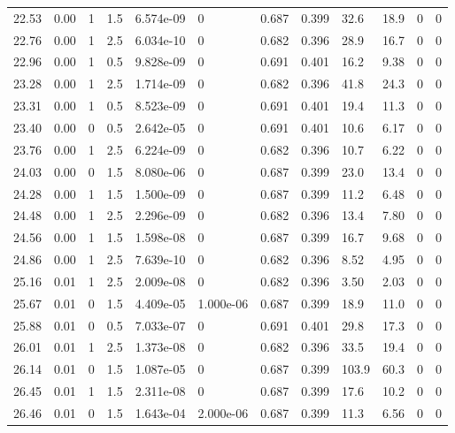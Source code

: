 \documentclass[preview]{standalone}
\begin{document}
{{{{\begin{tabular}{L{1.2cm}C{1.2cm} C{0.3cm}C{0.5cm} C{1.4cm}C{1.4cm} C{1.4cm}C{1.4cm} C{1.6cm}C{1.6cm} C{1.6cm}C{1.6cm}}
  22.53  &  0.00  & 1     & 1.5 &  6.574e-09  & 0  &  0.687&   0.399& 32.6 & 18.9   &  0 & 0  \\ 
  22.76  &  0.00  & 1     & 2.5 &  6.034e-10  & 0  &  0.682&   0.396& 28.9 & 16.7   &  0 & 0  \\ 
  22.96  &  0.00  & 1     & 0.5 &  9.828e-09  & 0  &  0.691&   0.401& 16.2 & 9.38   &  0 & 0  \\ 
  23.28  &  0.00  & 1     & 2.5 &  1.714e-09  & 0  &  0.682&   0.396& 41.8 & 24.3   &  0 & 0  \\ 
  23.31  &  0.00  & 1     & 0.5 &  8.523e-09  & 0  &  0.691&   0.401& 19.4 & 11.3   &  0 & 0  \\ 
  23.40  &  0.00  & 0     & 0.5 &  2.642e-05  & 0  &  0.691&   0.401& 10.6 & 6.17   &  0 & 0  \\ 
  23.76  &  0.00  & 1     & 2.5 &  6.224e-09  & 0  &  0.682&   0.396& 10.7 & 6.22   &  0 & 0  \\ 
  24.03  &  0.00  & 0     & 1.5 &  8.080e-06  & 0  &  0.687&   0.399& 23.0 & 13.4   &  0 & 0  \\ 
  24.28  &  0.00  & 1     & 1.5 &  1.500e-09  & 0  &  0.687&   0.399& 11.2 & 6.48   &  0 & 0  \\ 
  24.48  &  0.00  & 1     & 2.5 &  2.296e-09  & 0  &  0.682&   0.396& 13.4 & 7.80   &  0 & 0  \\ 
  24.56  &  0.00  & 1     & 1.5 &  1.598e-08  & 0  &  0.687&   0.399& 16.7 & 9.68   &  0 & 0  \\ 
  24.86  &  0.00  & 1     & 2.5 &  7.639e-10  & 0  &  0.682&   0.396& 8.52 & 4.95   &  0 & 0  \\ 
  25.16  &  0.01  & 1     & 2.5 &  2.009e-08  & 0  &  0.682&   0.396& 3.50 & 2.03   &  0 & 0  \\ 
  25.67  &  0.01  & 0     & 1.5 &  4.409e-05  & 1.000e-06  &  0.687&   0.399& 18.9 & 11.0   &  0 & 0  \\ 
  25.88  &  0.01  & 0     & 0.5 &  7.033e-07  & 0  &  0.691&   0.401& 29.8 & 17.3   &  0 & 0  \\ 
  26.01  &  0.01  & 1     & 2.5 &  1.373e-08  & 0  &  0.682&   0.396& 33.5 & 19.4   &  0 & 0  \\ 
  26.14  &  0.01  & 0     & 1.5 &  1.087e-05  & 0  &  0.687&   0.399& 103.9 & 60.3   &  0 & 0  \\ 
  26.45  &  0.01  & 1     & 1.5 &  2.311e-08  & 0  &  0.687&   0.399& 17.6 & 10.2   &  0 & 0  \\ 
  26.46  &  0.01  & 0     & 1.5 &  1.643e-04  & 2.000e-06  &  0.687&   0.399& 11.3 & 6.56   &  0 & 0  \\ 

\end{tabular}}}}}
\end{document}
